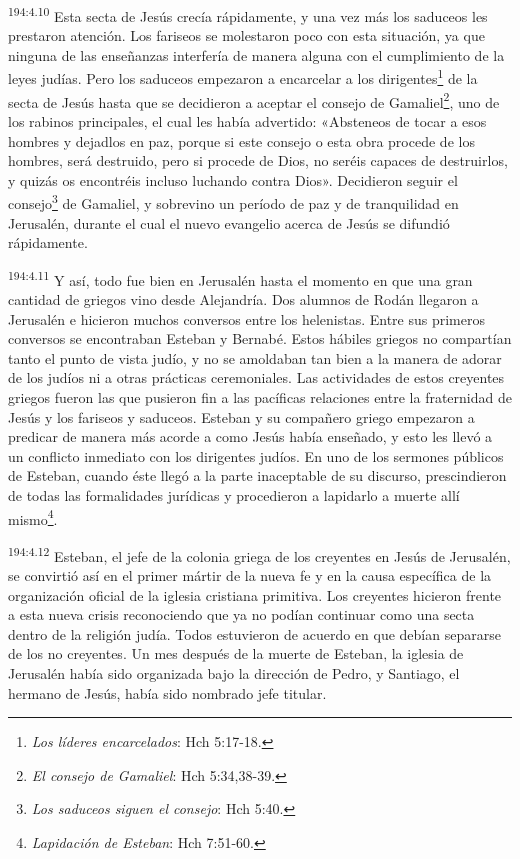 \par 
\textsuperscript{194:4.10} Esta secta de Jesús crecía rápidamente, y una vez más los saduceos les prestaron atención. Los fariseos se molestaron poco con esta situación, ya que ninguna de las enseñanzas interfería de manera alguna con el cumplimiento de la leyes judías. Pero los saduceos empezaron a encarcelar a los dirigentes\footnote{\textit{Los líderes encarcelados}: Hch 5:17-18.} de la secta de Jesús hasta que se decidieron a aceptar el consejo de Gamaliel\footnote{\textit{El consejo de Gamaliel}: Hch 5:34,38-39.}, uno de los rabinos principales, el cual les había advertido: «Absteneos de tocar a esos hombres y dejadlos en paz, porque si este consejo o esta obra procede de los hombres, será destruido, pero si procede de Dios, no seréis capaces de destruirlos, y quizás os encontréis incluso luchando contra Dios». Decidieron seguir el consejo\footnote{\textit{Los saduceos siguen el consejo}: Hch 5:40.} de Gamaliel, y sobrevino un período de paz y de tranquilidad en Jerusalén, durante el cual el nuevo evangelio acerca de Jesús se difundió rápidamente.

\par 
\textsuperscript{194:4.11} Y así, todo fue bien en Jerusalén hasta el momento en que una gran cantidad de griegos vino desde Alejandría. Dos alumnos de Rodán llegaron a Jerusalén e hicieron muchos conversos entre los helenistas. Entre sus primeros conversos se encontraban Esteban y Bernabé. Estos hábiles griegos no compartían tanto el punto de vista judío, y no se amoldaban tan bien a la manera de adorar de los judíos ni a otras prácticas ceremoniales. Las actividades de estos creyentes griegos fueron las que pusieron fin a las pacíficas relaciones entre la fraternidad de Jesús y los fariseos y saduceos. Esteban y su compañero griego empezaron a predicar de manera más acorde a como Jesús había enseñado, y esto les llevó a un conflicto inmediato con los dirigentes judíos. En uno de los sermones públicos de Esteban, cuando éste llegó a la parte inaceptable de su discurso, prescindieron de todas las formalidades jurídicas y procedieron a lapidarlo a muerte allí mismo\footnote{\textit{Lapidación de Esteban}: Hch 7:51-60.}.

\par 
\textsuperscript{194:4.12} Esteban, el jefe de la colonia griega de los creyentes en Jesús de Jerusalén, se convirtió así en el primer mártir de la nueva fe y en la causa específica de la organización oficial de la iglesia cristiana primitiva. Los creyentes hicieron frente a esta nueva crisis reconociendo que ya no podían continuar como una secta dentro de la religión judía. Todos estuvieron de acuerdo en que debían separarse de los no creyentes. Un mes después de la muerte de Esteban, la iglesia de Jerusalén había sido organizada bajo la dirección de Pedro, y Santiago, el hermano de Jesús, había sido nombrado jefe titular.

